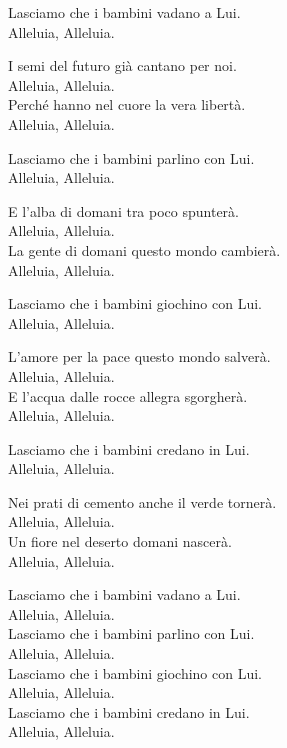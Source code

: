 
\strofa Lasciamo che i bambini vadano a Lui.\\
Alleluia, Alleluia. 

\spazio

I semi del futuro già cantano per noi.\\
Alleluia, Alleluia.\\
Perché hanno nel cuore la vera libertà.\\
Alleluia, Alleluia.

\spazio

\strofa Lasciamo che i bambini parlino con Lui.\\
Alleluia, Alleluia. 

\spazio

E l'alba di domani tra poco spunterà.\\
Alleluia, Alleluia.\\
La gente di domani questo mondo cambierà.\\
Alleluia, Alleluia.

\spazio

\strofa Lasciamo che i bambini giochino con Lui.\\
Alleluia, Alleluia. 

\spazio

L'amore per la pace questo mondo salverà.\\
Alleluia, Alleluia.\\
E l'acqua dalle rocce allegra sgorgherà.\\
Alleluia, Alleluia.

\spazio

\strofa Lasciamo che i bambini credano in Lui.\\
Alleluia, Alleluia. 

\spazio

Nei prati di cemento anche il verde tornerà.\\
Alleluia, Alleluia.\\
Un fiore nel deserto domani nascerà.\\
Alleluia, Alleluia.

\spazio

Lasciamo che i bambini vadano a Lui.\\
Alleluia, Alleluia.\\
Lasciamo che i bambini parlino con Lui.\\
Alleluia, Alleluia.\\
Lasciamo che i bambini giochino con Lui.\\
Alleluia, Alleluia.\\
Lasciamo che i bambini credano in Lui.\\
Alleluia, Alleluia.